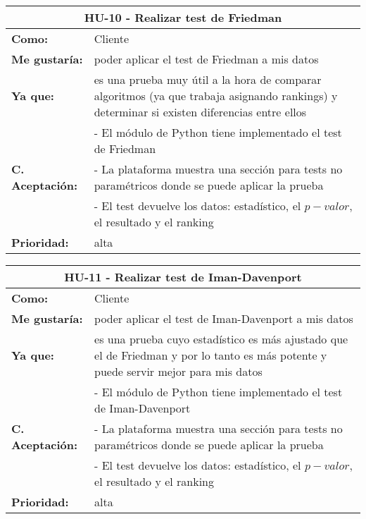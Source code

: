 
\begin{table}[H]
	\begin{tabular}{| p{3cm}| p{11cm} |}
		\hline
		\multicolumn{2}{|c|}{\textbf{HU-10} - Realizar test de Friedman} \\ \hline
		\textbf{Como:} & Cliente \\ \hline
		\textbf{Me gustaría:} & poder aplicar el test de Friedman a mis datos \\ \hline
		\textbf{Ya que:} & es una prueba muy útil a la hora de comparar algoritmos (ya que trabaja asignando rankings) y determinar si existen diferencias entre ellos \\ \hline
		\multirow{3}{11cm}{\textbf{C. Aceptación:}} & - El módulo de Python tiene implementado el test de Friedman \\
		& - La plataforma muestra una sección para tests no paramétricos donde se puede aplicar la prueba \\
		& - El test devuelve los datos: estadístico, el $p-valor$, el resultado y el ranking \\ \hline
		\textbf{\textbf{Prioridad:}} & alta \\ \hline
	\end{tabular}
\end{table}


\begin{table}[H]
	\begin{tabular}{| p{3cm}| p{11cm} |}
		\hline
		\multicolumn{2}{|c|}{\textbf{HU-11} - Realizar test de Iman-Davenport} \\ \hline
		\textbf{Como:} & Cliente \\ \hline
		\textbf{Me gustaría:} & poder aplicar el test de Iman-Davenport a mis datos \\ \hline
		\textbf{Ya que:} & es una prueba cuyo estadístico es más ajustado que el de Friedman y por lo tanto es más potente y puede servir mejor para mis datos \\ \hline
		\multirow{3}{11cm}{\textbf{C. Aceptación:}} & - El módulo de Python tiene implementado el test de Iman-Davenport \\
		& - La plataforma muestra una sección para tests no paramétricos donde se puede aplicar la prueba \\
		& - El test devuelve los datos: estadístico, el $p-valor$, el resultado y el ranking \\ \hline
		\textbf{\textbf{Prioridad:}} & alta \\ \hline
	\end{tabular}
\end{table}

